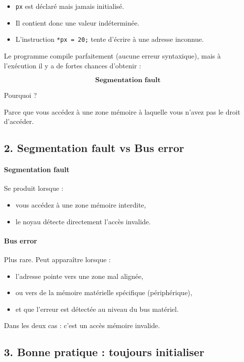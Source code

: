 \begin{itemize}
    \item \texttt{px} est déclaré mais jamais initialisé.
    \item Il contient donc une valeur indéterminée.
    \item L'instruction \texttt{*px = 20;} tente d'écrire à une adresse inconnue.
\end{itemize}

Le programme compile parfaitement (aucune erreur syntaxique),
mais à l’exécution il y a de fortes chances d’obtenir :

\[
\textbf{Segmentation fault}
\]

Pourquoi ?

Parce que vous accédez à une zone mémoire à laquelle vous n’avez pas le droit
d’accéder.

\subsection{2. Segmentation fault vs Bus error}

\paragraph{Segmentation fault}

Se produit lorsque :
\begin{itemize}
    \item vous accédez à une zone mémoire interdite,
    \item le noyau détecte directement l'accès invalide.
\end{itemize}

\paragraph{Bus error}

Plus rare. Peut apparaître lorsque :
\begin{itemize}
    \item l’adresse pointe vers une zone mal alignée,
    \item ou vers de la mémoire matérielle spécifique (périphérique),
    \item et que l’erreur est détectée au niveau du bus matériel.
\end{itemize}

Dans les deux cas : c’est un accès mémoire invalide.

\subsection{3. Bonne pratique : toujours initialiser}

